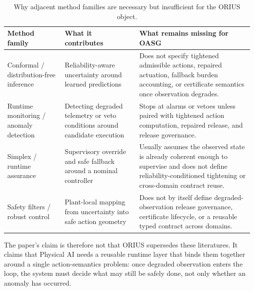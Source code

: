 \begin{table}[t]
\centering
\caption{Why adjacent method families are necessary but insufficient for the ORIUS object.}
\label{tab:ieee-family-gap}
\small
\begin{tabularx}{\textwidth}{@{}p{}p{}p{}@{}}
\toprule
\textbf{Method family} & \textbf{What it contributes} & \textbf{What remains missing for OASG}\\
\midrule
Conformal / distribution-free inference & Reliability-aware uncertainty around learned predictions & Does not specify tightened admissible actions, repaired actuation, fallback burden accounting, or certificate semantics once observation degrades.\\
Runtime monitoring / anomaly detection & Detecting degraded telemetry or veto conditions around candidate execution & Stops at alarms or vetoes unless paired with tightened action computation, repaired release, and release governance.\\
Simplex / runtime assurance & Supervisory override and safe fallback around a nominal controller & Usually assumes the observed state is already coherent enough to supervise and does not define reliability-conditioned tightening or cross-domain contract reuse.\\
Safety filters / robust control & Plant-local mapping from uncertainty into safe action geometry & Does not by itself define degraded-observation release governance, certificate lifecycle, or a reusable typed contract across domains.\\
\bottomrule
\end{tabularx}
\end{table}

The paper's claim is therefore not that ORIUS supersedes these literatures. It claims
that Physical AI needs a reusable runtime layer that binds them together around a
single action-semantics problem: once degraded observation enters the loop, the system
must decide what may still be safely done, not only whether an anomaly has occurred.
